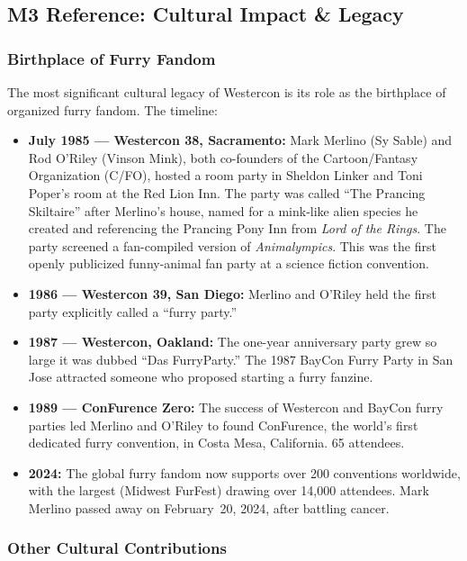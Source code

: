 \documentclass[11pt,letterpaper]{article}
\begin{document}
\subsection{M3 Reference: Cultural Impact \& Legacy}

\subsubsection{Birthplace of Furry Fandom}

The most significant cultural legacy of Westercon is its role as the birthplace of organized furry fandom. The timeline:

\begin{itemize}[leftmargin=2em]
  \item \textbf{July 1985 --- Westercon 38, Sacramento:} Mark Merlino (Sy Sable) and Rod O'Riley (Vinson Mink), both co-founders of the Cartoon/Fantasy Organization (C/FO), hosted a room party in Sheldon Linker and Toni Poper's room at the Red Lion Inn. The party was called ``The Prancing Skiltaire'' after Merlino's house, named for a mink-like alien species he created and referencing the Prancing Pony Inn from \emph{Lord of the Rings}. The party screened a fan-compiled version of \emph{Animalympics}. This was the first openly publicized funny-animal fan party at a science fiction convention.
  \item \textbf{1986 --- Westercon 39, San Diego:} Merlino and O'Riley held the first party explicitly called a ``furry party.''
  \item \textbf{1987 --- Westercon, Oakland:} The one-year anniversary party grew so large it was dubbed ``Das FurryParty.'' The 1987 BayCon Furry Party in San Jose attracted someone who proposed starting a furry fanzine.
  \item \textbf{1989 --- ConFurence Zero:} The success of Westercon and BayCon furry parties led Merlino and O'Riley to found ConFurence, the world's first dedicated furry convention, in Costa Mesa, California. 65 attendees.
  \item \textbf{2024:} The global furry fandom now supports over 200 conventions worldwide, with the largest (Midwest FurFest) drawing over 14,000 attendees. Mark Merlino passed away on February~20, 2024, after battling cancer.
\end{itemize}

\subsubsection{Other Cultural Contributions}
\end{document}
